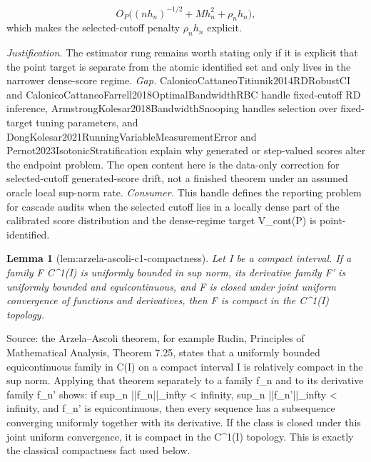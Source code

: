 \documentclass{article}
\newtheorem{lemma}{Lemma}
\begin{document}
\[
O_P\bigl((n h_n)^{-1/2}+M h_n^2+\rho_n h_n\bigr),
\]
which makes the selected-cutoff penalty \(\rho_n h_n\) explicit.
\par\smallskip\noindent \textit{Justification.} The estimator rung remains worth stating only if it is explicit that the point target is separate from the atomic identified set and only lives in the narrower dense-score regime. \textit{Gap.} CalonicoCattaneoTitiunik2014RDRobustCI and CalonicoCattaneoFarrell2018OptimalBandwidthRBC handle fixed-cutoff RD inference, ArmstrongKolesar2018BandwidthSnooping handles selection over fixed-target tuning parameters, and DongKolesar2021RunningVariableMeasurementError and Pernot2023IsotonicStratification explain why generated or step-valued scores alter the endpoint problem. The open content here is the data-only correction for selected-cutoff generated-score drift, not a finished theorem under an assumed oracle local sup-norm rate. \textit{Consumer.} This handle defines the reporting problem for cascade audits when the selected cutoff lies in a locally dense part of the calibrated score distribution and the dense-regime target V_cont(P) is point-identified.

\begin{lemma}[lem:arzela-ascoli-c1-compactness]\label{lem:arzela-ascoli-c1-compactness}
Let I be a compact interval. If a family F \subset C^1(I) is uniformly bounded in sup norm, its derivative family F' is uniformly bounded and equicontinuous, and F is closed under joint uniform convergence of functions and derivatives, then F is compact in the C^1(I) topology.
\end{lemma}
Source: the Arzela--Ascoli theorem, for example Rudin, Principles of Mathematical Analysis, Theorem 7.25, states that a uniformly bounded equicontinuous family in C(I) on a compact interval I is relatively compact in the sup norm. Applying that theorem separately to a family {f_n} and to its derivative family {f_n'} shows: if sup_n ||f_n||_infty < infinity, sup_n ||f_n'||_infty < infinity, and {f_n'} is equicontinuous, then every sequence has a subsequence converging uniformly together with its derivative. If the class is closed under this joint uniform convergence, it is compact in the C^1(I) topology. This is exactly the classical compactness fact used below.
\end{document}
